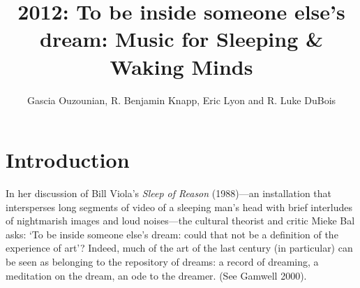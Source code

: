 
\graphicspath{ {mainmatter/Ouzounian_2012/} }

\title*{2012: To be inside someone else's dream: Music for Sleeping \& Waking Minds}


\author{Gascia Ouzounian, R. Benjamin Knapp, Eric Lyon and R. Luke DuBois}


%
%
\maketitle


\section{Introduction}

In her discussion of Bill Viola's \textit{Sleep of Reason} (1988)---an installation that intersperses long segments of video of a sleeping man's head with brief interludes of nightmarish images and loud noises---the cultural theorist and critic Mieke Bal asks: `To be inside someone else's dream: could that not be a definition of the experience of art'? \cite{Bal:2006} Indeed, much of the art of the last century (in particular) can be seen as belonging to the repository of dreams: a record of dreaming, a meditation on the dream, an ode to the dreamer. (See Gamwell 2000). \cite{Gamwell:2000}

